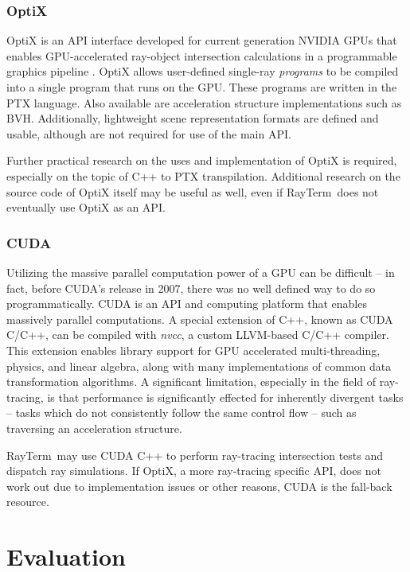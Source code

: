 \documentclass[11pt]{article}
\newcommand{\name}{{\sc RayTerm}}
\begin{document}
\subsubsection{OptiX}
\label{sec:method:optix}

OptiX is an API interface developed for current generation NVIDIA GPUs that enables GPU-accelerated ray-object intersection calculations in a programmable graphics pipeline \cite{parker2010optix}.
OptiX allows user-defined single-ray {\it programs} to be compiled into a single program that runs on the GPU.
These programs are written in the PTX language.
Also available are acceleration structure implementations such as BVH.
Additionally, lightweight scene representation formats are defined and usable, although are not required for use of the main API.

Further practical research on the uses and implementation of OptiX is required, especially on the topic of C++ to PTX transpilation.
Additional research on the source code of OptiX itself may be useful as well, even if \name\ does not eventually use OptiX as an API.

\subsubsection{CUDA}
\label{sec:method:cuda}

Utilizing the massive parallel computation power of a GPU can be difficult -- in fact, before CUDA's release in 2007, there was no well defined way to do so programmatically.
CUDA is an API and computing platform that enables massively parallel computations.
A special extension of C++, known as CUDA C/C++, can be compiled with {\it nvcc}, a custom LLVM-based C/C++ compiler.
This extension enables library support for GPU accelerated multi-threading, physics, and linear algebra, along with many implementations of common data transformation algorithms.
A significant limitation, especially in the field of ray-tracing, is that performance is significantly effected for inherently divergent tasks -- tasks which do not consistently follow the same control flow -- such as traversing an acceleration structure.

\name\ may use CUDA C++ to perform ray-tracing intersection tests and dispatch ray simulations.
If OptiX, a more ray-tracing specific API, does not work out due to implementation issues or other reasons, CUDA is the fall-back resource.

\section{Evaluation}
\label{sec:evaluate}
\end{document}
